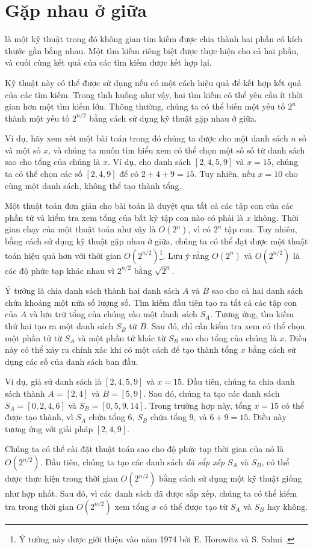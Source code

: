 \section{Gặp nhau ở giữa}


 là một kỹ thuật
trong đó không gian tìm kiếm được chia thành
hai phần có kích thước gần bằng nhau.
Một tìm kiếm riêng biệt được thực hiện
cho cả hai phần,
và cuối cùng kết quả của các tìm kiếm được kết hợp lại.

Kỹ thuật này có thể được sử dụng
nếu có một cách hiệu quả để kết hợp
kết quả của các tìm kiếm.
Trong tình huống như vậy, hai tìm kiếm có thể yêu cầu ít
thời gian hơn một tìm kiếm lớn.
Thông thường, chúng ta có thể biến một yếu tố $2^n$
thành một yếu tố $2^{n/2}$ bằng cách sử dụng kỹ thuật gặp nhau ở giữa.

Ví dụ, hãy xem xét một bài toán trong đó
chúng ta được cho một danh sách $n$ số và
một số $x$,
và chúng ta muốn tìm hiểu xem có thể
chọn một số số từ danh sách sao cho
tổng của chúng là $x$.
Ví dụ, cho danh sách $[2,4,5,9]$ và $x=15$,
chúng ta có thể chọn các số $[2,4,9]$ để có $2+4+9=15$.
Tuy nhiên, nếu $x=10$ cho cùng một danh sách,
không thể tạo thành tổng.

Một thuật toán đơn giản cho bài toán là
duyệt qua tất cả các tập con của các phần tử và
kiểm tra xem tổng của bất kỳ tập con nào có phải là $x$ không.
Thời gian chạy của một thuật toán như vậy là $O(2^n)$,
vì có $2^n$ tập con.
Tuy nhiên, bằng cách sử dụng kỹ thuật gặp nhau ở giữa,
chúng ta có thể đạt được một thuật toán hiệu quả hơn với thời gian $O(2^{n/2})$\footnote{Ý tưởng này
được giới thiệu vào năm 1974 bởi E. Horowitz và S. Sahni \cite{hor74}.}.
Lưu ý rằng $O(2^n)$ và $O(2^{n/2})$ là các
độ phức tạp khác nhau vì $2^{n/2}$ bằng $\sqrt{2^n}$.

Ý tưởng là chia danh sách thành
hai danh sách $A$ và $B$ sao cho cả hai
danh sách chứa khoảng một nửa số lượng số.
Tìm kiếm đầu tiên tạo ra tất cả các tập con
của $A$ và lưu trữ tổng của chúng vào một danh sách $S_A$.
Tương ứng, tìm kiếm thứ hai tạo ra
một danh sách $S_B$ từ $B$.
Sau đó, chỉ cần kiểm tra xem có thể
chọn một phần tử từ $S_A$ và một
phần tử khác từ $S_B$ sao cho tổng của chúng là $x$.
Điều này có thể xảy ra chính xác khi có một cách để
tạo thành tổng $x$ bằng cách sử dụng các số của danh sách ban đầu.

Ví dụ, giả sử danh sách là $[2,4,5,9]$ và $x=15$.
Đầu tiên, chúng ta chia danh sách thành $A=[2,4]$ và $B=[5,9]$.
Sau đó, chúng ta tạo các danh sách
$S_A=[0,2,4,6]$ và $S_B=[0,5,9,14]$.
Trong trường hợp này, tổng $x=15$ có thể được tạo thành,
vì $S_A$ chứa tổng $6$,
$S_B$ chứa tổng $9$, và $6+9=15$.
Điều này tương ứng với giải pháp $[2,4,9]$.

Chúng ta có thể cài đặt thuật toán sao cho
độ phức tạp thời gian của nó là $O(2^{n/2})$.
Đầu tiên, chúng ta tạo các danh sách \emph{đã sắp xếp} $S_A$ và $S_B$,
có thể được thực hiện trong thời gian $O(2^{n/2})$ bằng cách sử dụng một kỹ thuật giống như hợp nhất.
Sau đó, vì các danh sách đã được sắp xếp,
chúng ta có thể kiểm tra trong thời gian $O(2^{n/2})$ xem
tổng $x$ có thể được tạo từ $S_A$ và $S_B$ hay không.